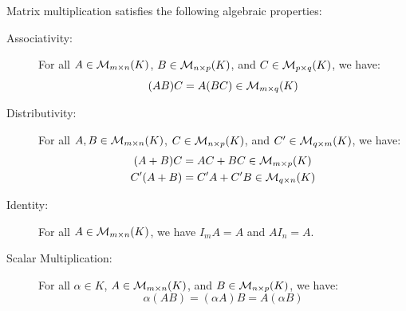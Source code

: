 \begin{proposition} 
\label{prop:matrix_multiplication_properties}
Matrix multiplication satisfies the following algebraic properties:
\begin{description}
    \item[Associativity:] For all $A \in \mathcal{M}_{m \times n}(K)$, $B \in \mathcal{M}_{n \times p}(K)$, and $C \in \mathcal{M}_{p \times q}(K)$, we have:
    \begin{equation*}
        (AB)C = A(BC) \in \mathcal{M}_{m \times q}(K)
    \end{equation*}
    \item[Distributivity:] For all $A, B \in \mathcal{M}_{m \times n}(K)$, $C \in \mathcal{M}_{n \times p}(K)$, and $C' \in \mathcal{M}_{q \times m}(K)$, we have:
    \begin{align*}
        (A + B)C &= AC + BC \in \mathcal{M}_{m \times p}(K) \\
        C'(A + B) &= C'A + C'B \in \mathcal{M}_{q \times n}(K)
    \end{align*}
    \item[Identity:] For all $A \in \mathcal{M}_{m \times n}(K)$, we have $I_m A = A$ and $A I_n = A$.
    \item[Scalar Multiplication:] For all $\alpha \in K$, $A \in \mathcal{M}_{m \times n}(K)$, and $B \in \mathcal{M}_{n \times p}(K)$, we have:
    \begin{equation*}
        \alpha(AB) = (\alpha A)B = A(\alpha B)
    \end{equation*}
\end{description}
\end{proposition}

